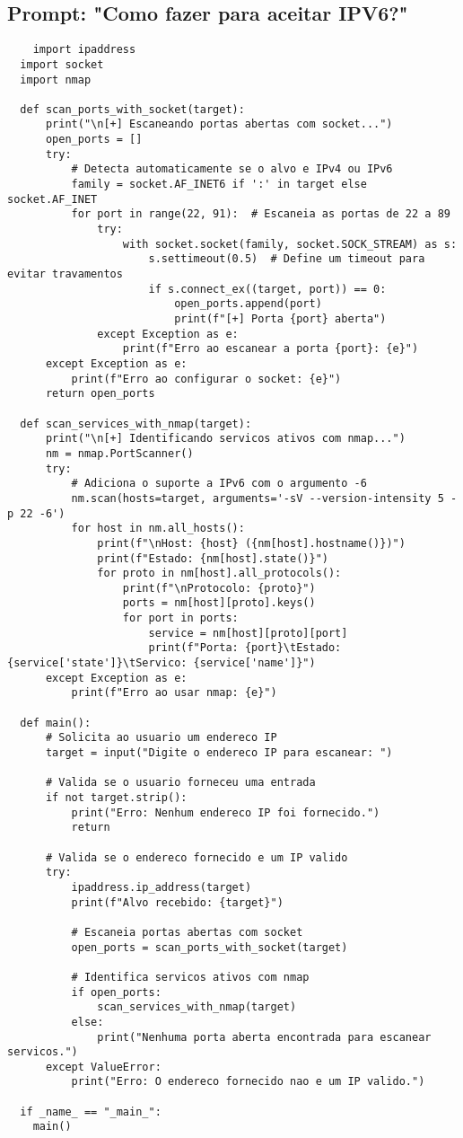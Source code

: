 \documentclass[12pt]{article}
\begin{document}
\subsection{\textbf{Prompt:} "Como fazer para aceitar IPV6?"}
    \begin{lstlisting}
    import ipaddress
  import socket
  import nmap

  def scan_ports_with_socket(target):
      print("\n[+] Escaneando portas abertas com socket...")
      open_ports = []
      try:
          # Detecta automaticamente se o alvo e IPv4 ou IPv6
          family = socket.AF_INET6 if ':' in target else socket.AF_INET
          for port in range(22, 91):  # Escaneia as portas de 22 a 89
              try:
                  with socket.socket(family, socket.SOCK_STREAM) as s:
                      s.settimeout(0.5)  # Define um timeout para evitar travamentos
                      if s.connect_ex((target, port)) == 0:
                          open_ports.append(port)
                          print(f"[+] Porta {port} aberta")
              except Exception as e:
                  print(f"Erro ao escanear a porta {port}: {e}")
      except Exception as e:
          print(f"Erro ao configurar o socket: {e}")
      return open_ports

  def scan_services_with_nmap(target):
      print("\n[+] Identificando servicos ativos com nmap...")
      nm = nmap.PortScanner()
      try:
          # Adiciona o suporte a IPv6 com o argumento -6
          nm.scan(hosts=target, arguments='-sV --version-intensity 5 -p 22 -6')
          for host in nm.all_hosts():
              print(f"\nHost: {host} ({nm[host].hostname()})")
              print(f"Estado: {nm[host].state()}")
              for proto in nm[host].all_protocols():
                  print(f"\nProtocolo: {proto}")
                  ports = nm[host][proto].keys()
                  for port in ports:
                      service = nm[host][proto][port]
                      print(f"Porta: {port}\tEstado: {service['state']}\tServico: {service['name']}")
      except Exception as e:
          print(f"Erro ao usar nmap: {e}")

  def main():
      # Solicita ao usuario um endereco IP
      target = input("Digite o endereco IP para escanear: ")

      # Valida se o usuario forneceu uma entrada
      if not target.strip():
          print("Erro: Nenhum endereco IP foi fornecido.")
          return

      # Valida se o endereco fornecido e um IP valido
      try:
          ipaddress.ip_address(target)
          print(f"Alvo recebido: {target}")

          # Escaneia portas abertas com socket
          open_ports = scan_ports_with_socket(target)

          # Identifica servicos ativos com nmap
          if open_ports:
              scan_services_with_nmap(target)
          else:
              print("Nenhuma porta aberta encontrada para escanear servicos.")
      except ValueError:
          print("Erro: O endereco fornecido nao e um IP valido.")

  if _name_ == "_main_":
    main()
    \end{lstlisting}
\end{document}
